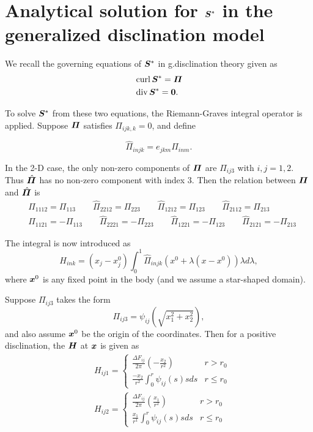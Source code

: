 \documentclass[11pt,letterpaper]{article}
\begin{document}
\appendix
\section{Analytical solution for $\bfS^{*}$ in the generalized disclination model} \label{sec:app1}

We recall the governing equations of $\bfS^{*}$ in g.disclination theory given as 
\begin{eqnarray*}
&\curl \bfS^{*} = \bfPi \\
&\divergence \bfS^{*} = \bf0.
\end{eqnarray*}

To solve $\bfS^{*}$ from these two equations, the Riemann-Graves integral operator \cite{edelen1985applied, edelen1988dispersion, acharya2001model} is applied. Suppose $\bfPi$ satisfies $\Pi_{ijk,k}=0$, and define 

\begin{equation*}
\hat{\Pi}_{injk} = e_{jkm} \Pi_{inm}.
\end{equation*}

In the 2-D case, the only non-zero components of $\bfPi$ are $\Pi_{ij3}$ with $i,j=1,2$. Thus $\hat{\bfPi}$ has no non-zero component with index $3$. Then the relation between $\bfPi$ and $\hat{\bfPi}$ is 
\begin{eqnarray*}
&\hat{\Pi}_{1112} = \Pi_{113} \qquad \hat{\Pi}_{2212} = \Pi_{223} \qquad \hat{\Pi}_{1212} = \Pi_{123} \qquad \hat{\Pi}_{2112} = \Pi_{213} \\
&\hat{\Pi}_{1121} = -\Pi_{113} \qquad \hat{\Pi}_{2221} = -\Pi_{223} \qquad \hat{\Pi}_{1221} = -\Pi_{123} \qquad \hat{\Pi}_{2121} = -\Pi_{213} 
\end{eqnarray*}

The integral is now introduced as 
\begin{equation*}
H_{ink} = (x_j-x^0_j) \int_0^1 \hat{\Pi}_{injk} (x^0 + \lambda(x-x^0))\lambda d\lambda,
\end{equation*}
where $\bfx^0$ is any fixed point in the body (and we assume a star-shaped domain).

Suppose $\Pi_{ij3}$ takes the form 
\begin{equation*}
\Pi_{ij3} = \psi_{ij}(\sqrt{x_1^2+x_2^2}),
\end{equation*}
and also assume $\bfx^0$ be the origin of the coordinates. Then for a positive disclination, the $\bfH$ at $\bfx$ is given as 
\begin{eqnarray*}
&H_{ij1} = 
\begin{cases}
\frac{\Delta F_{ij}}{2\pi}(-\frac{x_2}{r^2}) & r>r_0 \\
\frac{-x_2}{r^2}\int_0^r \psi_{ij}(s)sds & r \le r_0
\end{cases} \\
&H_{ij2} = 
\begin{cases}
\frac{\Delta F_{ij}}{2\pi}(\frac{x_1}{r^2}) & r>r_0 \\
\frac{x_1}{r^1}\int_0^r \psi_{ij}(s)sds & r \le r_0
\end{cases}
\end{eqnarray*}
\end{document}
